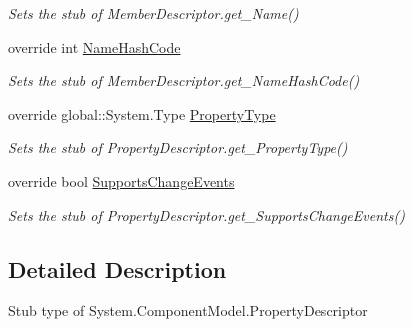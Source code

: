 \begin{DoxyCompactItemize}
\begin{DoxyCompactList}\small\item\em Sets the stub of Member\-Descriptor.\-get\-\_\-\-Name()\end{DoxyCompactList}\item 
override int \hyperlink{class_system_1_1_component_model_1_1_fakes_1_1_stub_property_descriptor_a8225ee6f5c07605fa4c36525ab05a926}{Name\-Hash\-Code}
\begin{DoxyCompactList}\small\item\em Sets the stub of Member\-Descriptor.\-get\-\_\-\-Name\-Hash\-Code()\end{DoxyCompactList}\item 
override global\-::\-System.\-Type \hyperlink{class_system_1_1_component_model_1_1_fakes_1_1_stub_property_descriptor_aaae123679ab61167fbcfa1dcf0d320f5}{Property\-Type}
\begin{DoxyCompactList}\small\item\em Sets the stub of Property\-Descriptor.\-get\-\_\-\-Property\-Type()\end{DoxyCompactList}\item 
override bool \hyperlink{class_system_1_1_component_model_1_1_fakes_1_1_stub_property_descriptor_aae9db6f07c859fa57817860f861e6cf8}{Supports\-Change\-Events}
\begin{DoxyCompactList}\small\item\em Sets the stub of Property\-Descriptor.\-get\-\_\-\-Supports\-Change\-Events()\end{DoxyCompactList}\end{DoxyCompactItemize}


\subsection{Detailed Description}
Stub type of System.\-Component\-Model.\-Property\-Descriptor



